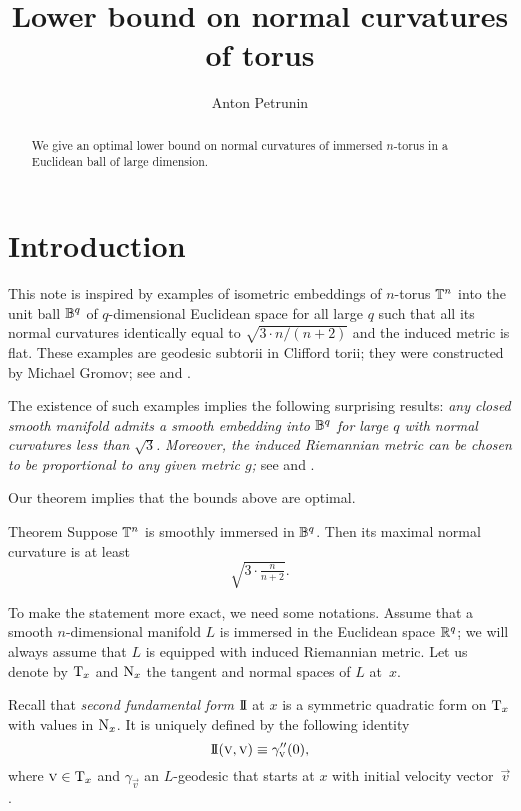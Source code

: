 \documentclass[a4paper,10pt]{article}
\begin{document}


\title{Lower bound on normal curvatures of torus}
\author{Anton Petrunin}
\date{}
\maketitle

\begin{abstract}
We give an optimal lower bound on normal curvatures of immersed $n$-torus in a Euclidean ball of large dimension. 
\end{abstract}

\section{Introduction}

This note is inspired by examples of isometric embeddings of $n$-torus $\mathbb{T}^n$ into the unit ball $\mathbb{B}^q$ of $q$-dimensional Euclidean space for all large $q$ such that all its normal curvatures identically equal to $\sqrt{3\cdot n/(n+2)}$ and the induced metric is flat.
These examples are geodesic subtorii in  Clifford torii;
they were constructed by Michael Gromov; see \cite[2.A]{gromov3} and \cite[1.1.A.]{gromov2}. 

The existence of such examples implies the following surprising results:
\textit{any closed smooth manifold admits a smooth embedding into $\mathbb{B}^q$ for large $q$ with normal curvatures less than $\sqrt{3}$.}
\textit{Moreover, the induced Riemannian metric can be chosen to be proportional to any given metric $g$;}
see \cite[1.D]{gromov3} and \cite[1.1.C]{gromov2}.

Our theorem implies that the bounds above are optimal.

\begin{thm}{Theorem}
\label{thm:main}
Suppose $\mathbb{T}^n$ is smoothly immersed in $\mathbb{B}^q$.
Then its maximal normal curvature is at least 
\[\sqrt{3\cdot \tfrac{n}{n+2}}.\]
\end{thm}

To make the statement more exact, we need some notations.
Assume that a smooth $n$-dimensional manifold $L$ is immersed in the Euclidean space $\mathbb{R}^q$;
we will always assume that $L$ is equipped with induced Riemannian metric.
Let us denote by $\mathrm{T}_x$ and $\mathrm{N}_x$ the tangent and normal spaces of $L$ at~$x$.

Recall that \emph{second fundamental form} $\mathrm{I}\!\mathrm{I}$ at $x$ is a symmetric quadratic form on $\mathrm{T}_x$ with values in $\mathrm{N}_x$.
It is uniquely defined by the following identity
\[\mathrm{I}\!\mathrm{I}(\text{\sc{v}},\text{\sc{v}})\equiv \gamma''_{\text{\sc{v}}}(0),\]
where $\text{\sc{v}}\in \mathrm{T}_x$ and $\gamma_{\vec v}$ an $L$-geodesic that starts at $x$ with initial velocity vector~$\vec v$.
\end{document}
